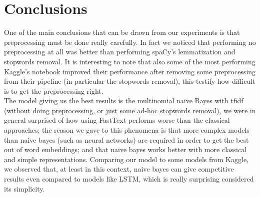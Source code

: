 \section*{Conclusions}
One of the main conclusions that can be drawn from our experiments is that preprocessing must be done really carefully. In fact we noticed that performing no preprocessing at all was better than performing spaCy's lemmatization and stopwords removal. It is interesting to note that also some of the most performing Kaggle's notebook improved their performance after removing some preprocessing from their pipeline (in particular the stopwords removal), this testify how difficult is to get the preprocessing right.\\
The model giving us the best results is the multinomial na\"ive Bayes with tfidf (without doing preprocessing, or just some ad-hoc stopwords removal), we were in general surprised of how using FastText performs worse than the classical approaches; the reason we gave to this phenomena is that  more complex models than naive bayes (such as neural networks) are required in order to get the best out of word embeddings; and that naive bayes works better with more classical and simple representations. Comparing our model to some models from Kaggle, we observed that, at least in this context, naive bayes can give competitive results even compared to models like LSTM, which is really surprising considered its simplicity.

